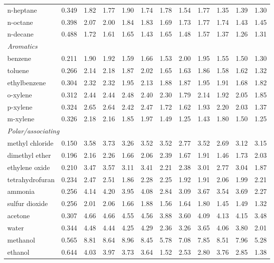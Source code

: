 \begin{table}[H]
\begin{tabular}{lccccccccccc}
n-heptane & 0.349 & 1.82 & 1.77 & 1.90 & 1.74 & 1.78 & 1.54 & 1.77 & 1.35 & 1.39 & 1.30 \\
n-octane & 0.398 & 2.07 & 2.00 & 1.84 & 1.83 & 1.69 & 1.73 & 1.77 & 1.74 & 1.43 & 1.45 \\
n-decane & 0.488 & 1.72 & 1.61 & 1.65 & 1.43 & 1.65 & 1.48 & 1.57 & 1.37 & 1.26 & 1.31 \\
\multicolumn{15}{l}{\emph{Aromatics}} \\
benzene & 0.211 & 1.90 & 1.92 & 1.59 & 1.66 & 1.53 & 2.00 & 1.95 & 1.55 & 1.50 & 1.30 \\
toluene & 0.266 & 2.14 & 2.18 & 1.87 & 2.02 & 1.65 & 1.63 & 1.86 & 1.58 & 1.62 & 1.32 \\
ethylbenzene & 0.304 & 2.32 & 2.32 & 1.95 & 2.13 & 1.88 & 1.87 & 1.95 & 1.91 & 1.68 & 1.82 \\
o-xylene & 0.312 & 2.44 & 2.44 & 2.48 & 2.40 & 2.30 & 1.79 & 2.14 & 1.92 & 2.05 & 1.85 \\
p-xylene & 0.324 & 2.65 & 2.64 & 2.42 & 2.47 & 1.72 & 1.62 & 1.93 & 2.20 & 2.03 & 1.37 \\
m-xylene & 0.326 & 2.18 & 2.16 & 1.85 & 1.97 & 1.49 & 1.25 & 1.43 & 1.80 & 1.50 & 1.25 \\
\multicolumn{15}{l}{\emph{Polar/associating}} \\
methyl chloride & 0.150 & 3.58 & 3.73 & 3.26 & 3.52 & 3.52 & 2.77 & 3.52 & 2.69 & 3.12 & 3.15 \\
dimethyl ether & 0.196 & 2.16 & 2.26 & 1.66 & 2.06 & 2.39 & 1.67 & 1.91 & 1.46 & 1.73 & 2.03 \\
ethylene oxide & 0.210 & 3.47 & 3.57 & 3.11 & 3.41 & 2.21 & 2.38 & 3.01 & 2.77 & 3.04 & 1.87 \\
tetrahydrofuran & 0.234 & 2.47 & 2.51 & 1.86 & 2.28 & 2.25 & 1.92 & 1.91 & 2.06 & 1.99 & 2.21 \\
ammonia & 0.256 & 4.14 & 4.20 & 3.95 & 4.08 & 2.84 & 3.09 & 3.67 & 3.54 & 3.69 & 2.27 \\
sulfur dioxide & 0.256 & 2.01 & 2.06 & 1.66 & 1.88 & 1.56 & 1.64 & 1.80 & 1.45 & 1.49 & 1.32 \\
acetone & 0.307 & 4.66 & 4.66 & 4.55 & 4.56 & 3.88 & 3.60 & 4.09 & 4.13 & 4.15 & 3.48 \\
water & 0.344 & 4.48 & 4.44 & 4.25 & 4.29 & 2.36 & 3.26 & 3.65 & 4.06 & 3.80 & 2.01 \\
methanol & 0.565 & 8.81 & 8.64 & 8.96 & 8.45 & 5.78 & 7.08 & 7.85 & 8.51 & 7.96 & 5.28 \\
ethanol & 0.644 & 4.03 & 3.97 & 3.73 & 3.64 & 1.52 & 2.53 & 2.80 & 3.76 & 2.85 & 1.38 \\

\end{tabular}
\end{table}
